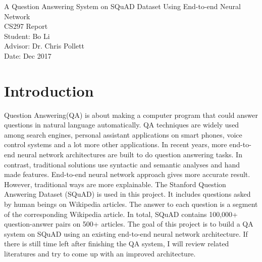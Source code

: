 \documentclass[12pt]{article}
\begin{document}
\begin{titlepage}
\begin{center}
        \vspace*{3cm}
        {\Huge A Question Answering System on SQuAD Dataset Using End-to-end Neural Network}\\

        \vspace*{3cm}
        {\Huge CS297 Report}\\

        \vspace{3 cm}
        Student: Bo Li\\
        Advisor: Dr. Chris Pollett\\
        Date: Dec 2017

 \end{center}
\clearpage
\end{titlepage}

\begin{titlepage}
\tableofcontents
\clearpage
\end{titlepage}



\section{Introduction}

Question Answering(QA) is about making a computer program that could answer questions in natural language automatically. QA techniques are widely used among search engines, personal assistant applications on smart phones, voice control systems and a lot more other applications. In recent years, more end-to-end neural network architectures are built to do question answering tasks. In contrast, traditional solutions use syntactic and semantic analyses and hand made features. End-to-end neural network approach gives more accurate result. However, traditional ways are more explainable. The Stanford Question Answering Dataset (SQuAD) is used in this project. It includes questions asked by human beings on Wikipedia articles. The answer to each question is a segment of the corresponding Wikipedia article\cite{rajpurkar2016squad}. In total, SQuAD contains 100,000+ question-answer pairs on 500+ articles\cite{rajpurkar2016squad}. The goal of this project is to build a QA system on SQuAD using an existing end-to-end neural network architecture. If there is still time left after finishing the QA system, I will review related literatures and try to come up with an improved architecture.
\end{document}
